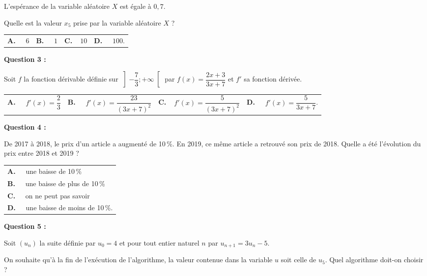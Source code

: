 \documentclass[10pt]{article}
\begin{document}
L’espérance de la variable aléatoire $X$ est égale à $0,7$.

Quelle est la valeur $x_5$ prise par la variable aléatoire $X$ ?


\begin{tabularx}{\linewidth}{*{4}{X}}
\textbf{A.~~} $6$ &\textbf{B.~~} $1$&\textbf{C.~~}$10$& \textbf{D.~~} $100$.
\end{tabularx}

\medskip
 \textbf{Question 3 :}
\medskip

 Soit $f$ la fonction dérivable définie sur $\left]-\dfrac{7}{3} ; +\infty\right[$ par $f(x)= \dfrac{2x+3}{3x+7}$ et $f'$ sa fonction dérivée.
 
 \begin{center}
 \begin{tabularx}{\linewidth}{*{4}{X}}
\textbf{A.~~} $f'(x)=\dfrac{2}{3} $ &\textbf{B.~~} $f'(x) =\dfrac{23}{(3x+7)^2}$&\textbf{C.~~}$f'(x)=\dfrac{5}{(3x+7)^2} $& \textbf{D.~~} $f'(x)=\dfrac{5}{3x+7}$.
\end{tabularx}
 \end{center}
 
\medskip
 \textbf{Question 4 :} 
\medskip

De 2017 à 2018, le prix d’un article a augmenté de 10\,\%. En 2019, ce même article a retrouvé son prix de 2018. Quelle a été l’évolution du prix entre 2018 et 2019 ?

\begin{tabularx}{\linewidth}{*{1}{X}}
\textbf{A.~~} une baisse de 10\,\%\\
\textbf{B.~~} une baisse de plus de 10\,\%\\
\textbf{C.~~} on ne peut pas savoir\\
\textbf{D.~~} une baisse de moins de 10\,\%.\\
\end{tabularx}

\medskip

\textbf{Question 5 :}

\medskip

Soit $\left(u_n\right)$ la suite définie par $u_0 = 4$ et pour tout entier naturel $n$ par $u_{n+1} = 3u_n - 5$.

On souhaite qu'à la fin de l'exécution de l'algorithme, la valeur contenue dans la variable $u$ soit celle de $u_5$. Quel algorithme doit-on choisir ?

\medskip
\end{document}
